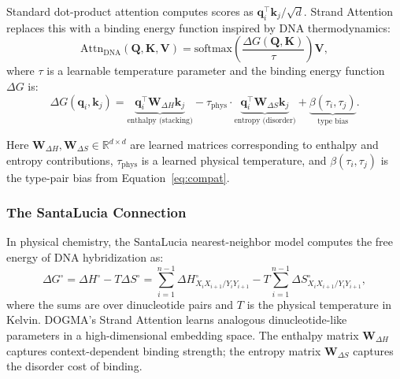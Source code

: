 Standard dot-product attention computes scores as $\mathbf{q}_i^\top \mathbf{k}_j / \sqrt{d}$. Strand Attention replaces this with a binding energy function inspired by DNA thermodynamics:
\begin{equation}
\mathrm{Attn}_{\text{DNA}}(\mathbf{Q}, \mathbf{K}, \mathbf{V}) = \mathrm{softmax}\!\left(\frac{\Delta G(\mathbf{Q}, \mathbf{K})}{\tau}\right) \mathbf{V},
\label{eq:dna-attention}
\end{equation}
where $\tau$ is a learnable temperature parameter and the binding energy function $\Delta G$ is:
\begin{equation}
\Delta G(\mathbf{q}_i, \mathbf{k}_j) = \underbrace{\mathbf{q}_i^\top \mathbf{W}_{\Delta H} \mathbf{k}_j}_{\text{enthalpy (stacking)}} - \tau_{\text{phys}} \cdot \underbrace{\mathbf{q}_i^\top \mathbf{W}_{\Delta S} \mathbf{k}_j}_{\text{entropy (disorder)}} + \underbrace{\beta(\tau_i, \tau_j)}_{\text{type bias}}.
\label{eq:delta-g}
\end{equation}

Here $\mathbf{W}_{\Delta H}, \mathbf{W}_{\Delta S} \in \mathbb{R}^{d \times d}$ are learned matrices corresponding to enthalpy and entropy contributions, $\tau_{\text{phys}}$ is a learned physical temperature, and $\beta(\tau_i, \tau_j)$ is the type-pair bias from Equation~\ref{eq:compat}.

\subsubsection{The SantaLucia Connection}

In physical chemistry, the SantaLucia nearest-neighbor model computes the free energy of DNA hybridization as:
\begin{equation}
\Delta G^{\circ} = \Delta H^{\circ} - T \Delta S^{\circ} = \sum_{i=1}^{n-1} \Delta H^{\circ}_{X_i X_{i+1} / Y_i Y_{i+1}} - T \sum_{i=1}^{n-1} \Delta S^{\circ}_{X_i X_{i+1} / Y_i Y_{i+1}},
\label{eq:santalucia}
\end{equation}
where the sums are over dinucleotide pairs and $T$ is the physical temperature in Kelvin. DOGMA's Strand Attention learns analogous dinucleotide-like parameters in a high-dimensional embedding space. The enthalpy matrix $\mathbf{W}_{\Delta H}$ captures context-dependent binding strength; the entropy matrix $\mathbf{W}_{\Delta S}$ captures the disorder cost of binding.

